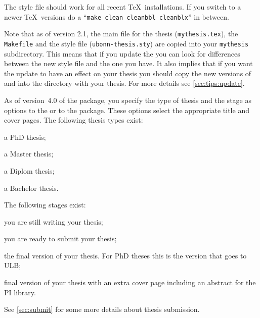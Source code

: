 The style file should work for all recent \TeX\ installations.
If you switch to a newer \TeX\ versions do a
\enquote{\texttt{make clean cleanbbl cleanblx}} in between.

Note that as of version 2.1, the main file for the thesis
(\texttt{mythesis.tex}), the \texttt{Makefile} and the style file
(\texttt{ubonn-thesis.sty}) are copied into your \texttt{mythesis}
subdirectory. This means that if you update the 
you can look for differences between the new style file and the one
you have. It also implies that if you want the update to have an
effect on your thesis you should copy the new versions of
 and  into the directory with your thesis.
For more details see \cref{sec:tips:update}.

As of version~4.0 of the package, you specify the type of thesis and the stage as options
to the  or to the  package.
These options select the appropriate title and cover pages.
The following thesis types exist:
\begin{description}\setlength{\parskip}{0pt}\setlength{\itemsep}{0pt}
\item[PhD] a PhD thesis;
\item[Master] a Master thesis;
\item[Diplom] a Diplom thesis;
\item[Bachelor] a Bachelor thesis.
\end{description}
The following stages exist:
\begin{description}\setlength{\parskip}{0pt}\setlength{\itemsep}{0pt}
\item[Draft] you are still writing your thesis;
\item[Submit] you are ready to submit your thesis;
\item[Final] the final version of your thesis.
  For PhD theses this is the version that goes to ULB\@;
\item[PILibrary] final version of your thesis with an extra cover page
  including an abstract for the PI library.
\end{description}
See \cref{sec:submit} for some more details about thesis submission.

